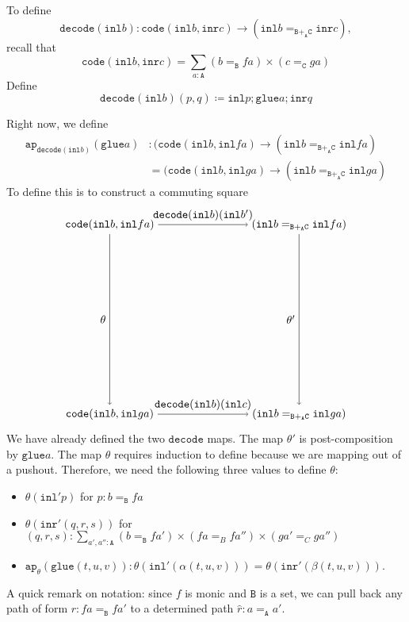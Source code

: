 \message{ !name(notes.tex)}\documentclass[12pt]{amsart}
\newcommand{\from}{\colon}
\newcommand{\bydef}{\coloneqq}
\newcommand{\type}[1]{\mathtt{#1}}
\newcommand{\tin}{\colon}
\newcommand{\A}{\type{A}}
\newcommand{\B}{\type{B}}
\newcommand{\C}{\type{C}}
\newcommand{\BAC}{\B +_{\A} \C}
\newcommand{\ap}{\type{ap}}
\newcommand{\inl}{\type{inl}}
\newcommand{\inr}{\type{inr}}
\newcommand{\glue}{\type{glue}}
\newcommand{\code}{\type{code}}
\newcommand{\decode}{\type{decode}}
\theoremstyle{remark}
\theoremstyle{definition}
\begin{document}

To define
\[
  \decode ( \inl b ) \from
  \code ( \inl b , \inr c ) \to
  ( \inl b =_{\BAC} \inr c ),
\]
recall that
\[
  \code ( \inl b , \inr c ) =
  \sum\limits_{a \tin \A} (b =_{\B} fa) \times (c =_{\C} ga)
\]
Define
\[
  \decode ( \inl b ) ( p , q ) \bydef
  \inl p ; \glue a ; \inr q
\]


Right now, we define
%
\begin{align*}
  \ap_{\decode ( \inl b ) } (\glue a) & \tin
  ( \code ( \inl b , \inl fa ) \to ( \inl b =_{\BAC} \inl fa ) \\
  & =
  ( \code ( \inl b , \inl ga ) \to ( \inl b =_{\BAC} \inl ga )
\end{align*}
%
To define this is to construct a commuting square
\[
\begin{tikzpicture}
  \node (1) at (-3,3)
    {\( \code ( \inl b , \inl fa ) \)};
  \node (2) at (-3,-3)
    {\( \code ( \inl b , \inl ga ) \)};
  \node (3) at (3,3)
    {\( ( \inl b =_{\BAC} \inl fa ) \)};
  \node (4) at (3,-3)
    {\( ( \inl b =_{\BAC} \inl ga ) \)};
  \draw [->] (1) to node [left]
    {\( \theta \)} (2);
  \draw [->] (1) to node [above]
    {\( \decode (\inl b )(\inl b') \)} (3);
  \draw [->] (3) to node [left]
    {\( \theta' \)} (4);
  \draw [->] (2) to node [above]
    {\( \decode (\inl b )(\inl c) \)} (4);
\end{tikzpicture}
\]
We have already defined the two \( \decode \) maps. The map \( \theta'
\) is post-composition by \( \glue a \). The map \( \theta \) requires
induction to define because we are mapping out of a pushout.
Therefore, we need the following three values to define \( \theta \):
\begin{itemize}
\item
  \(
    \theta (\inl' p)
  \)
  for
  \(
    p \tin b =_\B fa
  \)
\item
  \(
    \theta ( \inr' (q,r,s) )
  \)
  for
  \(
    (q,r,s) \tin
      \sum\limits_{a',a'' \tin \A}
      (b=_\B fa') \times (fa =_B fa'') \times (ga' =_C ga'')
  \) 
\item
  \(
    \ap_{ \theta } ( \glue (t,u,v) ) \tin
      \theta ( \inl' (\alpha (t,u,v) ) ) =
      \theta ( \inr' ( \beta (t,u,v) ) )
  \).
\end{itemize}

A quick remark on notation: since \( f \) is monic and \( \B \) is a
set, we can pull back any path of form \( r \tin fa =_\B fa'\) to a
determined path
\(
  \hat{r} \tin a =_\A a'.
\)
\end{document}
